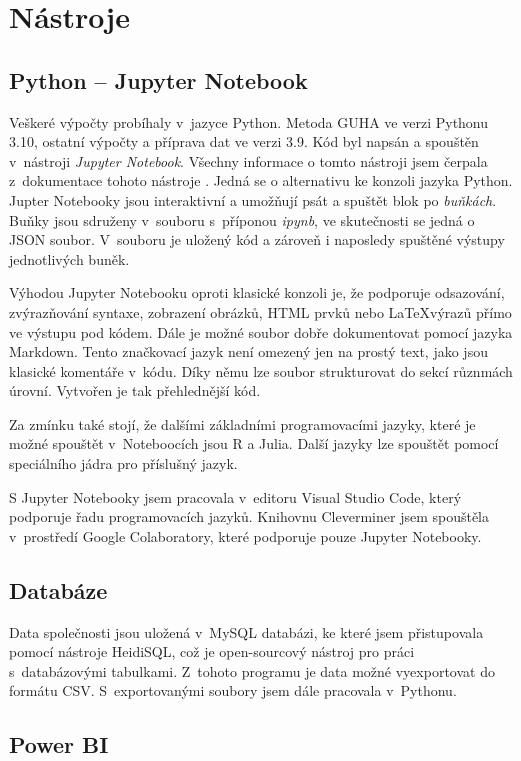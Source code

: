 \section{Nástroje}

\subsection{Python -- Jupyter Notebook}
Veškeré výpočty probíhaly v~jazyce Python. Metoda GUHA ve verzi Pythonu 3.10, ostatní výpočty a příprava dat ve verzi 3.9. Kód byl napsán a spouštěn v~nástroji\emph{ Jupyter Notebook}. Všechny informace o tomto nástroji jsem čerpala z~dokumentace tohoto nástroje \cite{bib:JN}. Jedná se o alternativu ke konzoli jazyka Python. Jupter Notebooky jsou interaktivní a umožňují psát a spuštět blok po \emph{buňkách}. Buňky jsou sdruženy v~souboru s~příponou \emph{ipynb}, ve skutečnosti se jedná o JSON soubor. V~souboru je uložený kód a zároveň i naposledy spuštěné výstupy jednotlivých buněk. 

Výhodou Jupyter Notebooku oproti klasické konzoli je, že podporuje odsazování, zvýrazňování syntaxe, zobrazení obrázků, HTML prvků nebo \LaTeX výrazů přímo ve výstupu pod kódem. Dále je možné soubor dobře dokumentovat pomocí jazyka Markdown. Tento značkovací jazyk není omezený jen na prostý text, jako jsou klasické komentáře v~kódu. Díky němu lze soubor strukturovat do sekcí různmách úrovní. Vytvořen je tak přehlednější kód. 

Za zmínku také stojí, že dalšími základními programovacími jazyky, které je možné spouštět v~Noteboocích jsou R a Julia. Další jazyky lze spouštět pomocí speciálního jádra pro příslušný jazyk.

S Jupyter Notebooky jsem pracovala v~editoru Visual Studio Code, který podporuje řadu programovacích jazyků. Knihovnu Cleverminer jsem spouštěla v~prostředí Google Colaboratory, které podporuje pouze Jupyter Notebooky.

\subsection*{Databáze}
Data společnosti jsou uložená v~MySQL databázi, ke které jsem přistupovala pomocí nástroje HeidiSQL, což je open-sourcový nástroj pro práci s~databázovými tabulkami. Z~tohoto programu je data možné vyexportovat do formátu CSV. S~exportovanými soubory jsem dále pracovala v~Pythonu.

\subsection{Power BI}
\label{sec:PBI}

